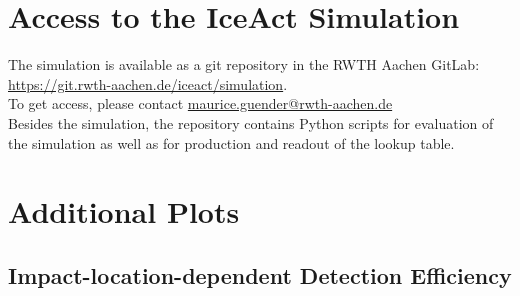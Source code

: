 \chapter{Access to the IceAct \geant Simulation}

The \iceact \geant simulation is available as a git repository in the RWTH Aachen \mbox{GitLab}:\\

\url{https://git.rwth-aachen.de/iceact/simulation}.\\

To get access, please contact \href{mailto:maurice.guender@rwth-aachen.de}{maurice.guender@rwth-aachen.de}\\

Besides the \geant simulation, the repository contains Python scripts for evaluation of the simulation as well as for production and readout of the lookup table.

\chapter{Additional Plots}

\section{Impact-location-dependent Detection Efficiency}\label{appendix:alienplots}

